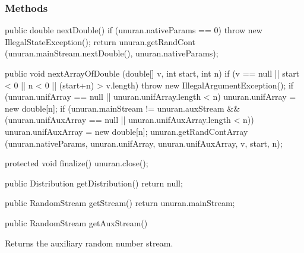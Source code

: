 \subsubsection* {Methods}
\begin{code}\begin{hide}

   public double nextDouble() {
      if (unuran.nativeParams == 0)
         throw new IllegalStateException();
      return unuran.getRandCont (unuran.mainStream.nextDouble(), unuran.nativeParams);
   }

   public void nextArrayOfDouble (double[] v, int start, int n) {
      if (v == null || start < 0 || n < 0 || (start+n) > v.length)
         throw new IllegalArgumentException();
      if (unuran.unifArray == null || unuran.unifArray.length < n)
         unuran.unifArray = new double[n];
      if (unuran.mainStream != unuran.auxStream &&
         (unuran.unifAuxArray == null || unuran.unifAuxArray.length < n))
         unuran.unifAuxArray = new double[n];
      unuran.getRandContArray (unuran.nativeParams, unuran.unifArray,
                        unuran.unifAuxArray, v, start, n);
   }

   protected void finalize() {
      unuran.close();
   }

   public Distribution getDistribution() { return null; }

   public RandomStream getStream() { return unuran.mainStream; }\end{hide}

   public RandomStream getAuxStream()\begin{hide} {
      return unuran.auxStream;
   }
}\end{hide}
\end{code}
\begin{tabb}   Returns the auxiliary random number stream.
\end{tabb}
